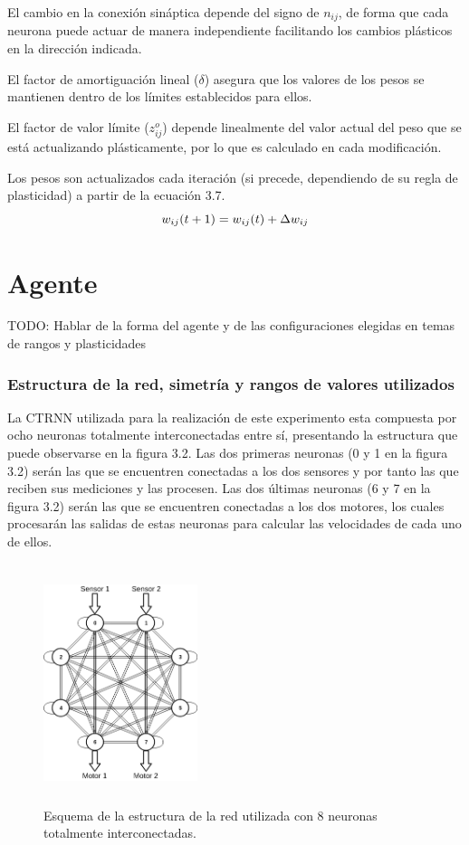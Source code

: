El cambio en la conexión sináptica depende del signo de $n_{ij}$, de forma que cada neurona puede actuar de manera independiente facilitando los cambios plásticos en la dirección indicada.

El factor de amortiguación lineal ($\delta$) asegura que los valores de los pesos se mantienen dentro de los límites establecidos para ellos.

El factor de valor límite ($z_{ij}^{o}$) depende linealmente del valor actual del peso que se está actualizando plásticamente, por lo que es calculado en cada modificación.

Los pesos son actualizados cada iteración (si precede, dependiendo de su regla de plasticidad) a partir de la ecuación 3.7.
\begin{equation} \label{eq:WeightUpdate}
 \centering
 w_{ij}(t+1) = w_{ij}(t) + \Delta w_{ij}
\end{equation}

\section{Agente}
TODO: Hablar de la forma del agente y de las configuraciones elegidas en temas de rangos y plasticidades

\subsubsection{Estructura de la red, simetría y rangos de valores utilizados}
La CTRNN utilizada para la realización de este experimento esta compuesta por ocho neuronas totalmente interconectadas entre sí, presentando la estructura que puede observarse en la figura 3.2.
Las dos primeras neuronas (0 y 1 en la figura 3.2) serán las que se encuentren conectadas a los dos sensores y por tanto las que reciben sus mediciones y las procesen. Las dos últimas neuronas
(6 y 7 en la figura 3.2) serán las que se encuentren conectadas a los dos motores, los cuales procesarán las salidas de estas neuronas para calcular las velocidades de cada uno de ellos.

\begin{figure}[!h]
	\centering
	\includegraphics[width=0.4\textwidth,height=7cm]{Imagenes/MyRed}
	\caption{Esquema de la estructura de la red utilizada con 8 neuronas totalmente interconectadas.}
	\label{fig:figuraMyRed}
\end{figure}

